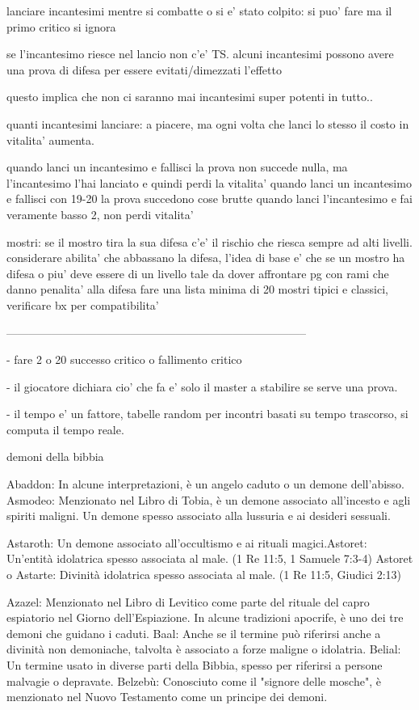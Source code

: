 \documentclass[12pt,a4paper,twoside,openany]{book}
\begin{document}
lanciare incantesimi mentre si combatte o si e' stato colpito: si puo' fare ma il primo critico si ignora

se l'incantesimo riesce nel lancio non c'e' TS. alcuni incantesimi possono avere una prova di difesa per essere evitati/dimezzati l'effetto

questo implica che non ci saranno mai incantesimi super potenti in tutto..

quanti incantesimi lanciare:  a piacere, ma ogni volta che lanci lo stesso il costo in vitalita' aumenta. 

quando lanci un incantesimo e fallisci la prova non succede nulla, ma l'incantesimo l'hai lanciato e quindi perdi la vitalita' 
quando lanci un incantesimo e fallisci con 19-20 la prova succedono cose  brutte
quando lanci l'incantesimo e fai veramente basso 2, non perdi vitalita'


mostri:
se il mostro tira la sua difesa c'e' il rischio che riesca sempre ad alti livelli. considerare abilita' che abbassano la difesa, l'idea di base e' che se un mostro ha difesa  o piu' deve essere di un livello tale da dover affrontare pg con rami che danno penalita' alla difesa
fare una lista minima di 20 mostri tipici e classici, verificare bx per compatibilita'


--------------------------------------------------------------------------------



- fare 2 o 20  successo critico o fallimento  critico

- il giocatore dichiara cio' che fa e' solo il master a stabilire se serve una prova. 

- il tempo e' un fattore, tabelle random per incontri basati su tempo trascorso, si computa il tempo reale.



demoni della bibbia

Abaddon: In alcune interpretazioni, è un angelo caduto o un demone dell'abisso.
Asmodeo: Menzionato nel Libro di Tobia, è un demone associato all'incesto e agli spiriti maligni. Un demone spesso associato alla lussuria e ai desideri sessuali.

Astaroth: Un demone associato all'occultismo e ai rituali magici.Astoret: Un'entità idolatrica spesso associata al male. (1 Re 11:5, 1 Samuele 7:3-4)
Astoret o Astarte: Divinità idolatrica spesso associata al male. (1 Re 11:5, Giudici 2:13)



Azazel: Menzionato nel Libro di Levitico come parte del rituale del capro espiatorio nel Giorno dell'Espiazione. In alcune tradizioni apocrife, è uno dei tre demoni che guidano i caduti.
Baal: Anche se il termine può riferirsi anche a divinità non demoniache, talvolta è associato a forze maligne o idolatria.
Belial: Un termine usato in diverse parti della Bibbia, spesso per riferirsi a persone malvagie o depravate.
Belzebù: Conosciuto come il "signore delle mosche", è menzionato nel Nuovo Testamento come un principe dei demoni.
\end{document}
